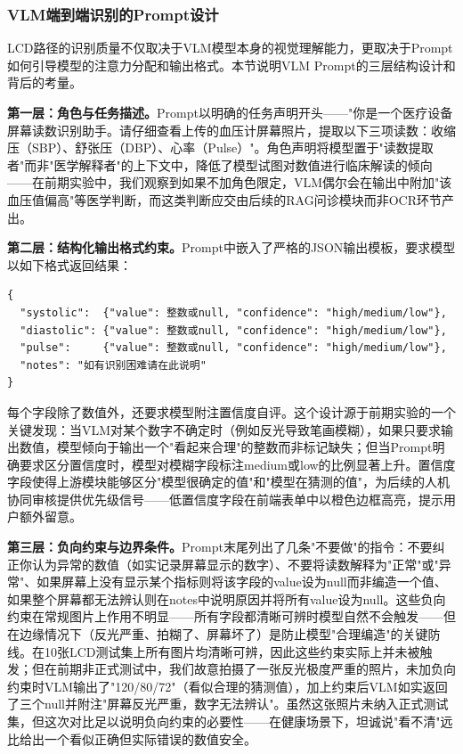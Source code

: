 \documentclass[zihao=-4,a4paper]{ctexart}
\begin{document}
\subsubsection{VLM端到端识别的Prompt设计}

LCD路径的识别质量不仅取决于VLM模型本身的视觉理解能力，更取决于Prompt如何引导模型的注意力分配和输出格式。本节说明VLM Prompt的三层结构设计和背后的考量。

\textbf{第一层：角色与任务描述。}Prompt以明确的任务声明开头——"你是一个医疗设备屏幕读数识别助手。请仔细查看上传的血压计屏幕照片，提取以下三项读数：收缩压（SBP）、舒张压（DBP）、心率（Pulse）"。角色声明将模型置于"读数提取者"而非"医学解释者"的上下文中，降低了模型试图对数值进行临床解读的倾向——在前期实验中，我们观察到如果不加角色限定，VLM偶尔会在输出中附加"该血压值偏高"等医学判断，而这类判断应交由后续的RAG问诊模块而非OCR环节产出。

\textbf{第二层：结构化输出格式约束。}Prompt中嵌入了严格的JSON输出模板，要求模型以如下格式返回结果：

\begin{lstlisting}[basicstyle=\ttfamily\zihao{5}, numbers=none]
{
  "systolic":  {"value": 整数或null, "confidence": "high/medium/low"},
  "diastolic": {"value": 整数或null, "confidence": "high/medium/low"},
  "pulse":     {"value": 整数或null, "confidence": "high/medium/low"},
  "notes": "如有识别困难请在此说明"
}
\end{lstlisting}

每个字段除了数值外，还要求模型附注置信度自评。这个设计源于前期实验的一个关键发现：当VLM对某个数字不确定时（例如反光导致笔画模糊），如果只要求输出数值，模型倾向于输出一个"看起来合理"的整数而非标记缺失；但当Prompt明确要求区分置信度时，模型对模糊字段标注medium或low的比例显著上升。置信度字段使得上游模块能够区分"模型很确定的值"和"模型在猜测的值"，为后续的人机协同审核提供优先级信号——低置信度字段在前端表单中以橙色边框高亮，提示用户额外留意。

\textbf{第三层：负向约束与边界条件。}Prompt末尾列出了几条"不要做"的指令：不要纠正你认为异常的数值（如实记录屏幕显示的数字）、不要将读数解释为"正常"或"异常"、如果屏幕上没有显示某个指标则将该字段的value设为null而非编造一个值、如果整个屏幕都无法辨认则在notes中说明原因并将所有value设为null。这些负向约束在常规图片上作用不明显——所有字段都清晰可辨时模型自然不会触发——但在边缘情况下（反光严重、拍糊了、屏幕坏了）是防止模型"合理编造"的关键防线。在10张LCD测试集上所有图片均清晰可辨，因此这些约束实际上并未被触发；但在前期非正式测试中，我们故意拍摄了一张反光极度严重的照片，未加负向约束时VLM输出了"120/80/72"（看似合理的猜测值），加上约束后VLM如实返回了三个null并附注"屏幕反光严重，数字无法辨认"。虽然这张照片未纳入正式测试集，但这次对比足以说明负向约束的必要性——在健康场景下，坦诚说"看不清"远比给出一个看似正确但实际错误的数值安全。
\end{document}
